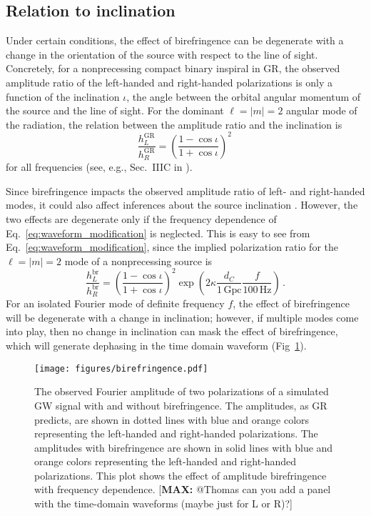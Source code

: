 \documentclass[aps,prd,twocolumn,superscriptaddress,preprintnumbers,floatfix,nofootinbib]{revtex4-2}
\newcommand*{\mi}[1]{\textsf{\color{magenta} [\textbf{MAX:} #1]}}
\begin{document}
\subsection{Relation to inclination}

Under certain conditions, the effect of birefringence can be degenerate with a change in the orientation of the source with respect to the line of sight.
Concretely, for a nonprecessing compact binary inspiral in \ac{GR}, the observed amplitude ratio of the left-handed and right-handed polarizations is only a function of the inclination $\iota$, the angle between the orbital angular momentum of the source and the line of sight.
For  the dominant $\ell = |m| = 2$ angular mode of the radiation, the relation between the amplitude ratio and the inclination is
\begin{equation}
    \frac{h_{L}^\mathrm{GR}}{h^\mathrm{GR}_{R}}=\left(\frac{1-\cos\iota}{1+\cos\iota}\right)^2\,
\end{equation}
for all frequencies (see, e.g., Sec.~IIIC in \cite{Isi:2022mbx}).

Since birefringence impacts the observed amplitude ratio of left- and right-handed modes, it could also affect inferences about the source inclination \cite{Alexander:2009tp}.
However, the two effects are degenerate only if the frequency dependence of Eq.~\eqref{eq:waveform_modification} is neglected.
This is easy to see from Eq.~\eqref{eq:waveform_modification}, since the implied polarization ratio for the $\ell = |m| = 2$ mode of a nonprecessing source is
\begin{equation}
    \frac{h_{L}^\mathrm{br}}{h_{R}^\mathrm{br}}=\left(\frac{1-\cos\iota}{1+\cos\iota}\right)^2
    \exp\left({2\kappa\frac{d_C}{1\, \mathrm{Gpc}}\frac{f}{100\, \mathrm{Hz}}}\right)\, .
    \label{eq:modified_amplitude_ratio}
\end{equation}
For an isolated Fourier mode of definite frequency $f$, the effect of birefringence will be degenerate with a change in inclination; however, if multiple modes come into play, then no change in inclination can mask the effect of birefringence, which will generate dephasing in the time domain waveform (Fig~\ref{fig:birefringence}).

\begin{figure}
    \texttt{[image: figures/birefringence.pdf]}
    \caption{
        The observed Fourier amplitude of two polarizations of a simulated GW signal with and without birefringence.
        The amplitudes, as GR predicts, are shown in dotted lines with blue and orange colors representing the left-handed and right-handed polarizations.
        The amplitudes with birefringence are shown in solid lines with blue and orange colors representing the left-handed and right-handed polarizations.
        This plot shows the effect of amplitude birefringence with frequency dependence.
        \mi{@Thomas can you add a panel with the time-domain waveforms (maybe just for L or R)?}
    }
    \label{fig:birefringence}
\end{figure}
\end{document}
